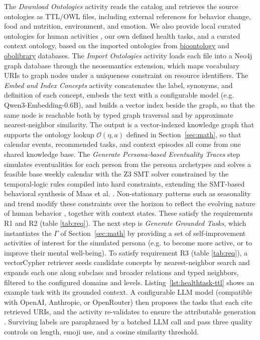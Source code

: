 \documentclass[runningheads]{llncs}
\begin{document}
The \textit{Download Ontologies} activity reads the catalog and retrieves the source ontologies as TTL/OWL files, including external references for behavior change, food and nutrition, environment, and emotion. We also provide local curated ontologies for human activities \citep{compendium}, our own defined health tasks, and a curated context ontology, based on the imported ontologies from \href{https://bioportal.bioontology.org/ontologies}{bioontology} and \href{https://obofoundry.org/}{obolibrary} databases. The \textit{Import Ontologies} activity loads each file into a Neo4j graph database through the neosemantics extension, which maps vocabulary URIs to graph nodes under a uniqueness constraint on resource identifiers. The \textit{Embed and Index Concepts} activity concatenates the label, synonyms, and definition of each concept, embeds the text with a configurable model (e.g. Qwen3-Embedding-0.6B), and builds a vector index beside the graph, so that the same node is reachable both by typed graph traversal and by approximate nearest-neighbor similarity. The output is a vector-indexed knowledge graph that supports the ontology lookup $\mathcal{O}(\eta,a)$ defined in Section~\ref{sec:math}, so that calendar events, recommended tasks, and context episodes all come from one shared knowledge base.
The \textit{Generate Persona-based Eventuality Traces} step simulates eventualities for each person from the persona archetypes and solves a feasible base weekly calendar with the Z3 SMT solver \citep{deMoura2008Z3:Systems} constrained by the temporal-logic rules compiled into hard constraints, extending the SMT-based behavioral synthesis of Maas et al. \citep{maas_generating_2026}. Non-stationary patterns such as seasonality and trend modify these constraints over the horizon to reflect the evolving nature of human behavior \citep{Barabasi2005}, together with context states. These satisfy the requirements R1 and R2 (table  \ref{tab:req}). The next step is \textit{Generate Grounded Tasks}, which instantiates the $\Gamma$ of Section~\ref{sec:math} by providing a set of self-improvement activities of interest for the simulated persona (e.g. to become more active, or to improve their mental well-being). To satisfy requirement R3 (table  \ref{tab:req}), a vectorCypher retriever seeds candidate concepts by nearest-neighbor search and expands each one along subclass and broader relations and typed neighbors, filtered to the configured domains and levels. Listing~\ref{lst:healthtask-ttl} shows an example task with its grounded context. A configurable LLM model (compatible with OpenAI, Anthropic, or OpenRouter) then proposes the tasks that each cite retrieved URIs, and the activity re-validates to ensure the attributable generation  \citep{zhang_survey_2025}. Surviving labels are paraphrased by a batched LLM call and pass three quality controls on length, emoji use, and a cosine similarity threshold.
\end{document}
